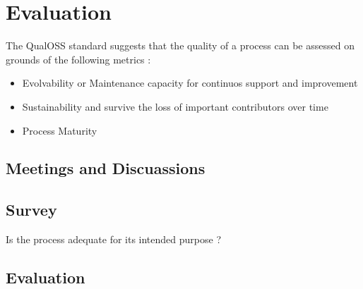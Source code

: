 \chapter{Evaluation}\label{chapter:Evaluation}
\indent The QualOSS standard suggests that the quality of a process can be assessed on grounds of the following metrics :
\begin{itemize}
\item Evolvability or Maintenance capacity for continuos support and improvement
\item Sustainability and survive the loss of important contributors over time
\item Process Maturity
\end{itemize}

\section{Meetings and Discuassions}
\section{Survey}
Is the process adequate for its intended purpose ?

\section{Evaluation}